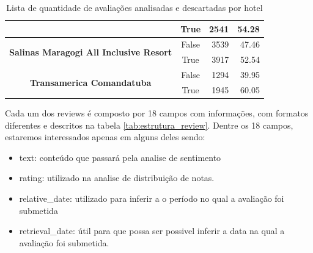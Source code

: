 \begin{table}[]
\begin{tabular}{|c|c|r|r|}
		                                                                        &
		True                                                                    &
		2541                                                                    &
		54.28                                                                     \\ \hline
		\multirow{2}{*}{\textbf{Salinas Maragogi All Inclusive Resort}}         &
		False                                                                   &
		3539                                                                    &
		47.46                                                                     \\ \cline{2-4}
		                                                                        &
		True                                                                    &
		3917                                                                    &
		52.54                                                                     \\ \hline
		\multirow{2}{*}{\textbf{Transamerica Comandatuba}}                      &
		False                                                                   &
		1294                                                                    &
		39.95                                                                     \\ \cline{2-4}
		                                                                        &
		True                                                                    &
		1945                                                                    &
		60.05                                                                     \\ \hline
	\end{tabular}
	\caption{Lista de quantidade de avaliações analisadas e descartadas por hotel}
	\label{tab:lista_review_hoteis}
\end{table}%
%

Cada um dos reviews é composto por 18 campos com informações, com formatos diferentes e descritos na tabela \ref{tab:estrutura_review}. Dentre os 18 campos, estaremos interessados apenas em alguns deles sendo:
\begin{itemize}
	\item text: conteúdo que passará pela analise de sentimento
	\item rating: utilizado na analise de distribuição de notas.
	\item relative\_date: utilizado para inferir a o período no qual a avaliação foi submetida
	\item retrieval\_date: útil para que possa ser possivel inferir a data na qual a avaliação foi submetida.
\end{itemize}

